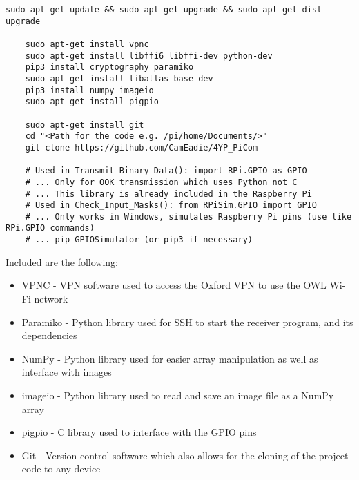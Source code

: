 \documentclass[../main.tex]{subfiles}
\begin{document}
\lstset{style=python}
\begin{lstlisting}[caption=Libraries and Packages Required for the Test Bed]
	sudo apt-get update && sudo apt-get upgrade && sudo apt-get dist-upgrade
	
	sudo apt-get install vpnc
	sudo apt-get install libffi6 libffi-dev python-dev
	pip3 install cryptography paramiko
	sudo apt-get install libatlas-base-dev
	pip3 install numpy imageio
	sudo apt-get install pigpio
	
	sudo apt-get install git
	cd "<Path for the code e.g. /pi/home/Documents/>"
	git clone https://github.com/CamEadie/4YP_PiCom

	# Used in Transmit_Binary_Data(): import RPi.GPIO as GPIO
	# ... Only for OOK transmission which uses Python not C
	# ... This library is already included in the Raspberry Pi
	# Used in Check_Input_Masks(): from RPiSim.GPIO import GPIO
	# ... Only works in Windows, simulates Raspberry Pi pins (use like RPi.GPIO commands)
	# ... pip GPIOSimulator (or pip3 if necessary)  
\end{lstlisting}

Included are the following:

\begin{itemize}
	\item VPNC - VPN software used to access the Oxford VPN to use the OWL Wi-Fi network
	\item Paramiko - Python library used for SSH to start the receiver program, and its dependencies
	\item NumPy - Python library used for easier array manipulation as well as interface with images
	\item imageio - Python library used to read and save an image file as a NumPy array
	\item pigpio - C library used to interface with the GPIO pins
	\item Git - Version control software which also allows for the cloning of the project code to any device
\end{itemize}

\clearpage

	
\end{document}
